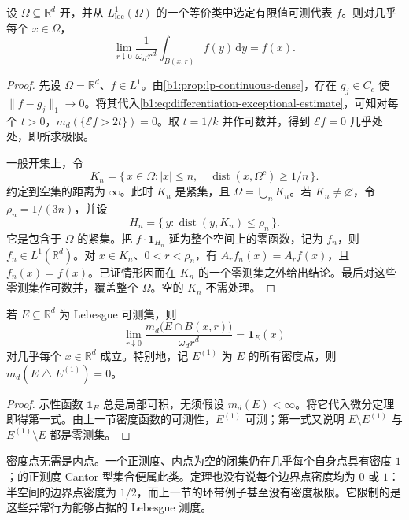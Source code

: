 \begin{theorem}[Lebesgue 微分]\label{b1:thm:lebesgue-differentiation}
设 \(\Omega\subseteq\mathbb R^d\) 开，并从 \(L^1_{\mathrm{loc}}(\Omega)\) 的一个等价类中选定有限值可测代表 \(f\)。则对几乎每个 \(x\in\Omega\)，
\[
 \lim_{r\downarrow0}\frac1{\omega_dr^d}\int_{B(x,r)}f(y)\,\mathrm dy=f(x).
\]
\end{theorem}
\begin{proof}
先设 \(\Omega=\mathbb R^d\)、\(f\in L^1\)。由\cref{b1:prop:lp-continuous-dense}，存在 \(g_j\in C_c\) 使 \(\|f-g_j\|_1\to0\)。将其代入\eqref{b1:eq:differentiation-exceptional-estimate}，可知对每个 \(t>0\)，\(m_d(\{\mathcal E f>2t\})=0\)。取 \(t=1/k\) 并作可数并，得到 \(\mathcal E f=0\) 几乎处处，即所求极限。

一般开集上，令
\[
 K_n=\{\,x\in\Omega:|x|\leq n,\quad
               \operatorname{dist}(x,\Omega^c)\geq1/n\,\}.
\]
约定到空集的距离为 \(\infty\)。此时 \(K_n\) 是紧集，且 \(\Omega=\bigcup_nK_n\)。若 \(K_n\ne\varnothing\)，令 \(\rho_n=1/(3n)\)，并设
\[
 H_n=\{\,y:\operatorname{dist}(y,K_n)\leq\rho_n\,\}.
\]
它是包含于 \(\Omega\) 的紧集。把 \(f\cdot\mathbf1_{H_n}\) 延为整个空间上的零函数，记为 \(f_n\)，则 \(f_n\in L^1(\mathbb R^d)\)。对 \(x\in K_n\)、\(0<r<\rho_n\)，有 \(A_rf_n(x)=A_rf(x)\)，且 \(f_n(x)=f(x)\)。已证情形因而在 \(K_n\) 的一个零测集之外给出结论。最后对这些零测集作可数并，覆盖整个 \(\Omega\)。空的 \(K_n\) 不需处理。
\end{proof}

\begin{corollary}[Lebesgue 密度]\label{b1:thm:lebesgue-density}
若 \(E\subseteq\mathbb R^d\) 为 Lebesgue 可测集，则
\[
 \lim_{r\downarrow0}\frac{m_d\bigl(E\cap B(x,r)\bigr)}{\omega_dr^d}
 =\mathbf1_E(x)
\]
对几乎每个 \(x\in\mathbb R^d\) 成立。特别地，记 \(E^{(1)}\) 为 \(E\) 的所有密度点，则 \(m_d(E\mathbin{\triangle} E^{(1)})=0\)。
\end{corollary}
\begin{proof}
示性函数 \(\mathbf1_E\) 总是局部可积，无须假设 \(m_d(E)<\infty\)。将它代入微分定理即得第一式。由上一节密度函数的可测性，\(E^{(1)}\) 可测；第一式又说明 \(E\setminus E^{(1)}\) 与 \(E^{(1)}\setminus E\) 都是零测集。
\end{proof}

密度点无需是内点。一个正测度、内点为空的闭集仍在几乎每个自身点具有密度 \(1\)；的正测度 Cantor 型集合便属此类。定理也没有说每个边界点密度均为 \(0\) 或 \(1\)：半空间的边界点密度为 \(1/2\)，而上一节的环带例子甚至没有密度极限。它限制的是这些异常行为能够占据的 Lebesgue 测度。

